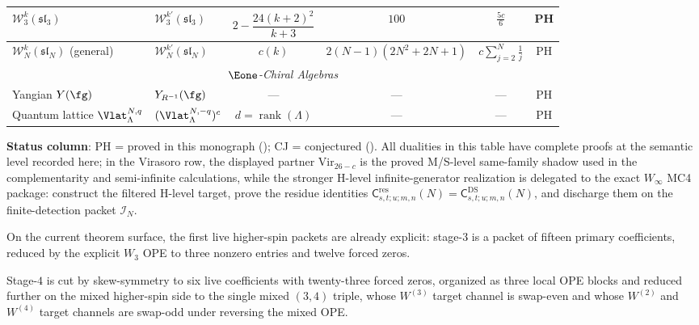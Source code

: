 \begin{table}[ht]
{{\begin{tabular}{|l|l|c|c|c|c|}
\hline
$\mathcal{W}_3^k(\mathfrak{sl}_3)$
  & $\mathcal{W}_3^{k'}(\mathfrak{sl}_3)$
  & $2 - \dfrac{24(k{+}2)^2}{k{+}3}$ & $100$ & $\tfrac{5c}{6}$ & PH \\[4pt]
\hline
$\mathcal{W}_N^k(\mathfrak{sl}_N)$ (general)
  & $\mathcal{W}_N^{k'}(\mathfrak{sl}_N)$
  & $c(k)$ & $2(N{-}1)(2N^2{+}2N{+}1)$
  & $c \displaystyle\sum_{j=2}^{N}\tfrac{1}{j}$ & PH \\[6pt]
\hline
\multicolumn{6}{|c|}{\textit{$\Eone$-Chiral Algebras}} \\
\hline
Yangian $Y(\fg)$
  & $Y_{R^{-1}}(\fg)$
  & --- & --- & --- & PH \\
\hline
Quantum lattice $\Vlat_\Lambda^{N,q}$
  & $(\Vlat_\Lambda^{N,-q})^c$
  & $d = \operatorname{rank}(\Lambda)$ & ---
  & --- & PH \\
\hline
\end{tabular}%
}%
}%
\end{table}

\noindent\textbf{Status column}: PH = proved in this monograph
(\ClaimStatusProvedHere); CJ = conjectured (\ClaimStatusConjectured).
All dualities in this table have complete proofs at the semantic level
recorded here; in the Virasoro row, the displayed partner
$\mathrm{Vir}_{26-c}$ is the proved M/S-level same-family shadow used in
the complementarity and semi-infinite calculations, while the stronger
H-level infinite-generator realization is delegated to the exact
$W_\infty$ MC4 package: construct the filtered H-level target, prove
the residue identities
$\mathsf{C}^{\mathrm{res}}_{s,t;u;m,n}(N)
=\mathsf{C}^{\mathrm{DS}}_{s,t;u;m,n}(N)$,
and discharge them on the finite-detection packet $\mathcal{I}_N$.

On the current theorem surface, the first live higher-spin packets are
already explicit: stage-$3$ is a packet of fifteen primary
coefficients, reduced by the explicit $W_3$ OPE to three nonzero
entries and twelve forced zeros.

Stage-$4$ is cut by skew-symmetry to six live coefficients with
twenty-three forced zeros, organized as three local OPE blocks and
reduced further on the mixed higher-spin side to the single mixed
$(3,4)$ triple, whose $W^{(3)}$ target channel is swap-even and whose
$W^{(2)}$ and $W^{(4)}$ target channels are swap-odd under reversing
the mixed OPE.

